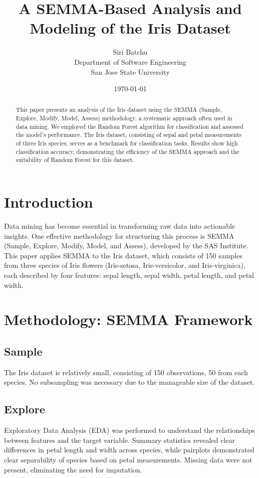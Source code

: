 \documentclass{article}
\title{A SEMMA-Based Analysis and Modeling of the Iris Dataset}
\author{ Siri Batchu \\ Department of Software Engineering \\ San Jose State University}
\date{\today}
\begin{document}
\maketitle

\begin{abstract}
This paper presents an analysis of the Iris dataset using the SEMMA (Sample, Explore, Modify, Model, Assess) methodology, a systematic approach often used in data mining. We employed the Random Forest algorithm for classification and assessed the model's performance. The Iris dataset, consisting of sepal and petal measurements of three Iris species, serves as a benchmark for classification tasks. Results show high classification accuracy, demonstrating the efficiency of the SEMMA approach and the suitability of Random Forest for this dataset.
\end{abstract}

\section{Introduction}
Data mining has become essential in transforming raw data into actionable insights. One effective methodology for structuring this process is SEMMA (Sample, Explore, Modify, Model, and Assess), developed by the SAS Institute. This paper applies SEMMA to the Iris dataset, which consists of 150 samples from three species of Iris flowers (Iris-setosa, Iris-versicolor, and Iris-virginica), each described by four features: sepal length, sepal width, petal length, and petal width.

\section{Methodology: SEMMA Framework}

\subsection{Sample}
The Iris dataset is relatively small, consisting of 150 observations, 50 from each species. No subsampling was necessary due to the manageable size of the dataset.

\subsection{Explore}
Exploratory Data Analysis (EDA) was performed to understand the relationships between features and the target variable. Summary statistics revealed clear differences in petal length and width across species, while pairplots demonstrated clear separability of species based on petal measurements. Missing data were not present, eliminating the need for imputation.
\end{document}
